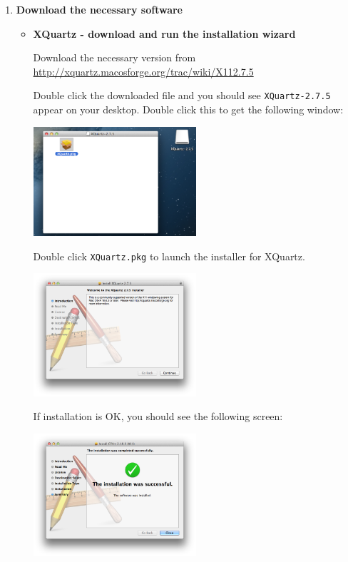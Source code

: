 \documentclass[10pt,a4paper,twoside]{article}
\begin{document}
\begin{enumerate}
\item \textbf{Download the necessary software}
  \begin{itemize}
  \item \textbf{XQuartz - download and run the installation wizard}

    Download the necessary version from\\
    \url{http://xquartz.macosforge.org/trac/wiki/X112.7.5}

    Double click the downloaded file and you should see \verb+XQuartz-2.7.5+ appear on
    your desktop. Double click this to get the following window:
    \begin{center}
      \includegraphics[width=0.5\textwidth,trim=0cm 5cm 0cm 0cm,clip=TRUE]{fig/mountain-lion/s1-c.png}
    \end{center}

    Double click \verb+XQuartz.pkg+ to launch the installer for XQuartz.
    \begin{center}
      \includegraphics[width=0.5\textwidth]{fig/mountain-lion/s1-d.png}
    \end{center}
    
    If installation is OK, you should see the following screen:
    \begin{center}
      \includegraphics[width=0.5\textwidth]{fig/mountain-lion/s1-b.png}
    \end{center}
    

\end{itemize}
\end{enumerate}
\end{document}
